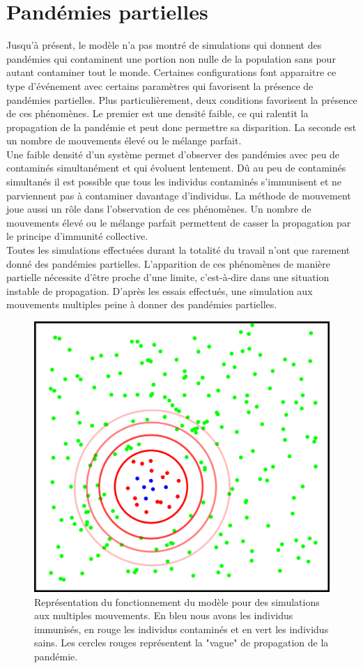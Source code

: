 \section{Pandémies partielles}

Jusqu'à présent, le modèle n'a pas montré de simulations qui donnent des pandémies qui contaminent une portion non nulle de la population sans pour autant contaminer tout le monde. Certaines configurations font apparaitre ce type d'événement avec certains paramètres qui favorisent la présence de pandémies partielles. Plus particulièrement, deux conditions favorisent la présence de ces phénomènes. Le premier est une densité faible, ce qui ralentit la propagation de la pandémie et peut donc permettre sa disparition. La seconde est un nombre de mouvements élevé ou le mélange parfait.\\

Une faible densité d'un système permet d'observer des pandémies avec peu de contaminés simultanément et qui évoluent lentement. Dû au peu de contaminés simultanés il est possible que tous les individus contaminés s'immunisent et ne parviennent pas à contaminer davantage d'individus. La méthode de mouvement joue aussi un rôle dans l'observation de ces phénomènes. Un nombre de mouvements élevé ou le mélange parfait permettent de casser la propagation par le principe d'immunité collective.\\

Toutes les simulations effectuées durant la totalité du travail n’ont que rarement donné des pandémies partielles. L’apparition de ces phénomènes de manière partielle nécessite d’être proche d’une limite, c’est-à-dire dans une situation instable de propagation. D’après les essais effectués, une simulation aux mouvements multiples peine à donner des pandémies partielles. 

\begin{figure}[h]
	\centering
	\captionsetup{justification=centering}
	\includegraphics[width=.5\textwidth]{Images/vague_propagation.png}
	\caption[Vague de propagation]{Représentation du fonctionnement du modèle pour des simulations aux multiples mouvements. En bleu nous avons les individus immunisés, en rouge les individus contaminés et en vert les individus sains. Les cercles rouges représentent la "vague" de propagation de la pandémie.}
\end{figure} 

